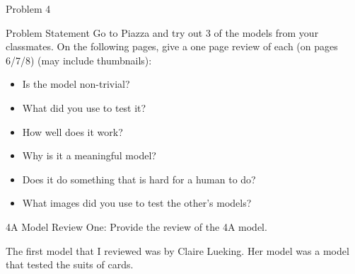 \begin{problem}{Problem 4}
    \begin{statement}{Problem Statement}
        Go to Piazza and try out 3 of the models from your classmates. On the following pages, give a one page review of each (on pages 6/7/8) (may include thumbnails):
        \begin{itemize}
            \item Is the model non-trivial?
            \item What did you use to test it?
            \item How well does it work?
            \item Why is it a meaningful model?
            \item Does it do something that is hard for a human to do?
            \item What images did you use to test the other's models?
        \end{itemize}
    \end{statement}

    \clearpage
    \begin{statement}{4A Model Review One:}
        Provide the review of the 4A model.
    \end{statement}

    \begin{highlight}[Solution]
        The first model that I reviewed was by Claire Lueking. Her model was a model that tested the suits of cards. 


\end{highlight}
\end{problem}
